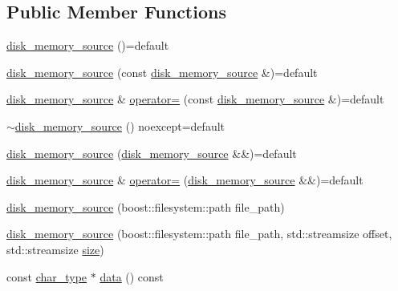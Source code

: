 \subsection*{Public Member Functions}
\begin{DoxyCompactItemize}
\item 
\mbox{\hyperlink{classirk_1_1disk__memory__source_ab36e14dfbd67bbbb71386dc7a59a49df}{disk\+\_\+memory\+\_\+source}} ()=default
\item 
\mbox{\hyperlink{classirk_1_1disk__memory__source_ac30d797a76b0b077bcd6f41e80168d65}{disk\+\_\+memory\+\_\+source}} (const \mbox{\hyperlink{classirk_1_1disk__memory__source}{disk\+\_\+memory\+\_\+source}} \&)=default
\item 
\mbox{\hyperlink{classirk_1_1disk__memory__source}{disk\+\_\+memory\+\_\+source}} \& \mbox{\hyperlink{classirk_1_1disk__memory__source_ad02ca60ed29684e3e32711599c93fdb3}{operator=}} (const \mbox{\hyperlink{classirk_1_1disk__memory__source}{disk\+\_\+memory\+\_\+source}} \&)=default
\item 
\mbox{\hyperlink{classirk_1_1disk__memory__source_a4a1bac9b3e247452635cba43384f9e3f}{$\sim$disk\+\_\+memory\+\_\+source}} () noexcept=default
\item 
\mbox{\hyperlink{classirk_1_1disk__memory__source_aafd940f79556fbd391fe60f3e0cbdf84}{disk\+\_\+memory\+\_\+source}} (\mbox{\hyperlink{classirk_1_1disk__memory__source}{disk\+\_\+memory\+\_\+source}} \&\&)=default
\item 
\mbox{\hyperlink{classirk_1_1disk__memory__source}{disk\+\_\+memory\+\_\+source}} \& \mbox{\hyperlink{classirk_1_1disk__memory__source_a451e7a9bb8a227a1f76d5108441c31f7}{operator=}} (\mbox{\hyperlink{classirk_1_1disk__memory__source}{disk\+\_\+memory\+\_\+source}} \&\&)=default
\item 
\mbox{\hyperlink{classirk_1_1disk__memory__source_af1ffaac873ff29803fca78d3446df4e0}{disk\+\_\+memory\+\_\+source}} (boost\+::filesystem\+::path file\+\_\+path)
\item 
\mbox{\hyperlink{classirk_1_1disk__memory__source_a5b908030dd3a3f288127be13b2d878d8}{disk\+\_\+memory\+\_\+source}} (boost\+::filesystem\+::path file\+\_\+path, std\+::streamsize offset, std\+::streamsize \mbox{\hyperlink{classirk_1_1disk__memory__source_a6704788104e3593d275909ed0e558133}{size}})
\item 
const \mbox{\hyperlink{classirk_1_1disk__memory__source_a029ab1ba55fc543025c42ee3d7320dca}{char\+\_\+type}} $\ast$ \mbox{\hyperlink{classirk_1_1disk__memory__source_a7ce46af8d31725e5266cb02cf433c524}{data}} () const

\end{DoxyCompactItemize}
